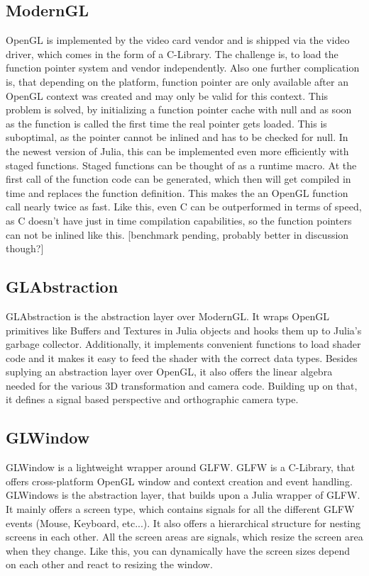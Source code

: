 \subsection{ModernGL}
\ac{OpenGL} is implemented by the video card vendor and is shipped via the video driver, which comes in the form of a C-Library.
The challenge is, to load the function pointer system and vendor independently. Also one further complication is, that depending on the platform, function pointer are only available after an \ac{OpenGL} context was created and may only be valid for this context. \cite{wgl}
This problem is solved, by initializing a function pointer cache with null and as soon as the function is called the first time the real pointer gets loaded. This is suboptimal, as the pointer cannot be inlined and has to be checked for null.
In the newest version of Julia, this can be implemented even more efficiently with staged functions. Staged functions can be thought of as a runtime macro.
At the first call of the function code can be generated, which then will get compiled in time and replaces the function definition. 
This makes the an \ac{OpenGL} function call nearly twice as fast.
Like this, even C can be outperformed in terms of speed, as C doesn't have just in time compilation capabilities, so the function pointers can not be inlined like this. [benchmark pending, probably better in discussion though?]


\subsection{GLAbstraction}
GLAbstraction is the abstraction layer over ModernGL.
It wraps \ac{OpenGL} primitives like Buffers and Textures in Julia objects and hooks them up to Julia's garbage collector.
Additionally, it implements convenient functions to load shader code and it makes it easy to feed the shader with the correct data types.
Besides suplying an abstraction layer over \ac{OpenGL}, it also offers the linear algebra needed for the various 3D transformation and camera code.
Building up on that, it defines a signal based perspective and orthographic camera type.


\subsection{GLWindow}
GLWindow is a lightweight wrapper around GLFW. GLFW is a C-Library, that offers cross-platform \ac{OpenGL} window and context creation and event handling.
GLWindows is the abstraction layer, that builds upon a Julia wrapper of GLFW.
It mainly offers a screen type, which contains signals for all the different GLFW events (Mouse, Keyboard, etc...). 
It also offers a hierarchical structure for nesting screens in each other. 
All the screen areas are signals, which resize the screen area when they change. Like this, you can dynamically have the screen sizes depend on each other and react to resizing the window.



